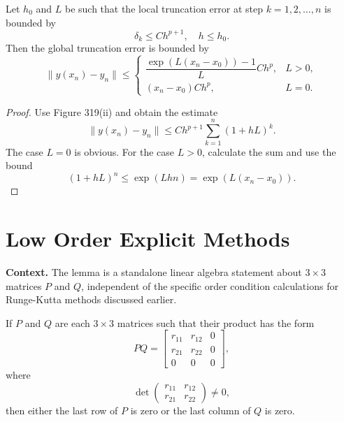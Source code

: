 \begin{theorem}

  \label{thm:319B}
Let $h_0$ and $L$ be such that the local truncation error at step $k = 1, 2, \dots, n$ is bounded by
\[
\delta_k \leq C h^{p+1}, \quad h \leq h_0.
\]
Then the global truncation error is bounded by
\[
\| y(x_n) - y_n \| \leq 
\begin{cases}
\dfrac{\exp(L(x_n - x_0)) - 1}{L} C h^p, & L > 0, \\
(x_n - x_0) C h^p, & L = 0.
\end{cases}
\]
\end{theorem}

\begin{proof}
Use Figure 319(ii) and obtain the estimate
\[
\| y(x_n) - y_n \| \leq C h^{p+1} \sum_{k=1}^{n} (1 + h L)^k.
\]
The case $L = 0$ is obvious. For the case $L > 0$, calculate the sum and use the bound
\[
(1 + h L)^n \leq \exp(L h n) = \exp(L (x_n - x_0)).
\]
\end{proof}

\section{Low Order Explicit Methods}

\noindent\textbf{Context.}
The lemma is a standalone linear algebra statement about $3\times 3$ matrices $P$ and $Q$, independent of the specific order condition calculations for Runge-Kutta methods discussed earlier.

\begin{lemma}

  \label{lem:322A}
  \uses{}
If $P$ and $Q$ are each $3 \times 3$ matrices such that their product has the form
\[
PQ = \begin{bmatrix}
r_{11} & r_{12} & 0 \\
r_{21} & r_{22} & 0 \\
0 & 0 & 0
\end{bmatrix},
\]
where
\[
\det \begin{pmatrix}
r_{11} & r_{12} \\
r_{21} & r_{22}
\end{pmatrix} \neq 0,
\]
then either the last row of $P$ is zero or the last column of $Q$ is zero.
\end{lemma}

